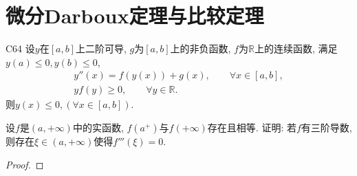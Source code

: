 \section{微分Darboux定理与比较定理}
\begin{theorem}{}{C64}
设\(y\)在\([a,b]\)上二阶可导, \(g\)为\([a,b]\)上的非负函数, \(f\)为\(\mathbb{R}\)上的连续函数, 满足\(y(a)\leqslant 0,y(b)\leqslant 0\),\begin{gather*}
y''(x)=f(y(x))+g(x),\qquad\forall x\in[a,b],\\
yf(y)\geqslant 0,\qquad\forall y\in\mathbb{R}.
\end{gather*}则\(y(x)\leqslant 0,(\forall x\in[a,b])\).
\end{theorem}
\begin{quiza}
\woe 设\(f\)是\((a,+\infty)\)中的实函数, \(f(a^+)\)与\(f(+\infty)\)存在且相等. 证明: 若\(f\)有三阶导数, 则存在\(\xi\in(a,+\infty)\)使得\(f'''(\xi)=0\).
\begin{proof}


\end{proof}
\end{quiza}
